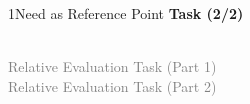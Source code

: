 \documentclass[xcolor=table,9pt,aspectratio=169]{beamer}
\begin{document}
\begin{frame}{\vspace*{10mm}1\hspace*{1em}Need as Reference Point}
\textbf{Task (2/2)}\\
\begin{multicols}{2}
   \begin{center}
      \\
      \textcolor{gray}{Relative Evaluation Task (Part 1)}
      \\
      \textcolor{gray}{Relative Evaluation Task (Part 2)}
   \end{center}
\end{multicols}
\end{frame}
\end{document}
